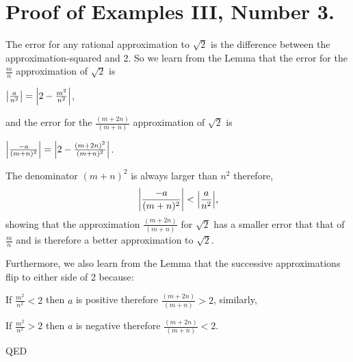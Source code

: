 \documentclass{article}
\DeclarePairedDelimiter\abs{\lvert}{\rvert}
\begin{document}
\break
\section*{Proof of Examples III, Number 3.}
The error for any rational approximation to $\sqrt{2}$ is the difference between the
approximation-squared and 2.
So we learn from the Lemma that the error for the $\frac{m}{n}$ approximation of $\sqrt{2}$ is\newline
\centerline{$\abs*{\frac{a}{n^2}} = \abs*{2 - \frac{m^2}{n^2}}$,}

and the error for the $\frac{(m+2n)}{(m+n)}$ approximation of $\sqrt{2}$ is\newline
\centerline{$\abs*{\frac{-a}{(m+n)^2}} = \abs*{2 - \frac{(m+2n)^2}{(m+n)^2}}$.}

\bigskip
The denominator $(m+n)^2$ is always larger than $n^2$ therefore,
\[\abs*{\frac{-a}{(m+n)^2}} < \abs*{\frac{a}{n^2}} \text{,}\]
showing that the approximation $\frac{(m+2n)}{(m+n)}$ for
$\sqrt{2}$ 
has a smaller error that that of $\frac{m}{n}$ and is therefore
a better approximation to $\sqrt{2}$.

Furthermore, we also learn from the Lemma that the successive approximations flip
to either side of 2 because:

If $\frac{m^2}{n^2} < 2$ then $a$ is positive therefore $\frac{(m+2n)}{(m+n)} > 2$, similarly,

If $\frac{m^2}{n^2} > 2$ then $a$ is negative therefore $\frac{(m+2n)}{(m+n)} < 2$.

\bigskip

\centerline{QED}
\end{document}
